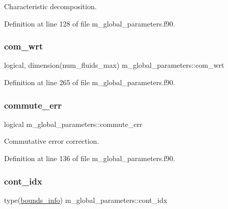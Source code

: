 Characteristic decomposition. 



Definition at line 128 of file m\+\_\+global\+\_\+parameters.\+f90.

\mbox{\label{namespacem__global__parameters_a36d8d56515556bc34bc0c88da60f6b62}} 
\subsubsection{\texorpdfstring{com\+\_\+wrt}{com\_wrt}}
{\footnotesize\ttfamily logical, dimension(num\+\_\+fluids\+\_\+max) m\+\_\+global\+\_\+parameters\+::com\+\_\+wrt}



Definition at line 265 of file m\+\_\+global\+\_\+parameters.\+f90.

\mbox{\label{namespacem__global__parameters_a5a340deb003a37dc81b7a560343242b1}} 
\subsubsection{\texorpdfstring{commute\+\_\+err}{commute\_err}}
{\footnotesize\ttfamily logical m\+\_\+global\+\_\+parameters\+::commute\+\_\+err}



Commutative error correction. 



Definition at line 136 of file m\+\_\+global\+\_\+parameters.\+f90.

\mbox{\label{namespacem__global__parameters_adefe3b78bf286d73a56aef49880dfb0d}} 
\subsubsection{\texorpdfstring{cont\+\_\+idx}{cont\_idx}}
{\footnotesize\ttfamily type(\hyperlink{structm__derived__types_1_1bounds__info}{bounds\+\_\+info}) m\+\_\+global\+\_\+parameters\+::cont\+\_\+idx}




